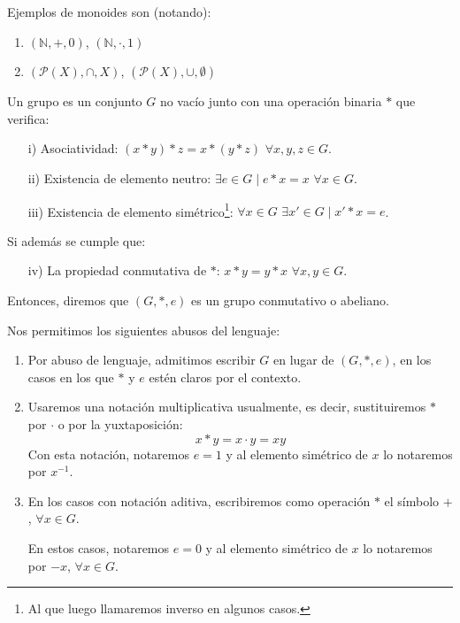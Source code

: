 \begin{ejemplo}
    Ejemplos de monoides son (notando):
    \begin{enumerate}
        \item $(\mathbb{N}, +, 0)$, $(\mathbb{N}, \cdot, 1)$
        \item $(\mathcal{P}(X), \cap, X)$, $(\mathcal{P}(X), \cup, \emptyset )$
    \end{enumerate}
\end{ejemplo}

\begin{definicion}[grupo]
    Un grupo es un conjunto $G$ no vacío junto con una operación binaria $\ast$ que verifica:
    \begin{enumerate}
        \item[i)] Asociatividad: $(x\ast y)\ast z = x\ast (y\ast z)$ $\forall x,y,z\in G$.
        \item[ii)] Existencia de elemento neutro: $\exists e\in G \mid e\ast x = x$ $\forall x\in G$.
        \item[iii)] Existencia de elemento simétrico\footnote{Al que luego llamaremos inverso en algunos casos.}: $\forall x\in G$ $\exists x'\in G \mid x'\ast x = e$.
    \end{enumerate}
    Si además se cumple que:
    \begin{enumerate}
        \item[iv)] La propiedad conmutativa de $\ast$: $x\ast y=y\ast x$ $\forall x,y\in G$.
    \end{enumerate}
    Entonces, diremos que $(G,\ast,e)$ es un grupo conmutativo o abeliano.
\end{definicion}

\begin{notacion}
    Nos permitimos los siguientes abusos del lenguaje:
    \begin{enumerate}
        \item Por abuso de lenguaje, admitimos escribir $G$ en lugar de $(G,\ast,e)$, en los casos en los que $\ast$ y $e$ estén claros por el contexto.
        \item Usaremos una notación multiplicativa usualmente, es decir, sustituiremos $\ast$ por $\cdot$ o por la yuxtaposición:
            \begin{equation*}
                x\ast y = x\cdot y = xy
            \end{equation*}
            Con esta notación, notaremos $e = 1$ y al elemento simétrico de $x$ lo notaremos por $x^{-1}$.
        \item En los casos con notación aditiva, escribiremos como operación $\ast$ el símbolo $+$, $\forall x\in G$.

            En estos casos, notaremos $e=0$ y al elemento simétrico de $x$ lo notaremos por $-x$, $\forall x\in G$.
    \end{enumerate}
\end{notacion}

